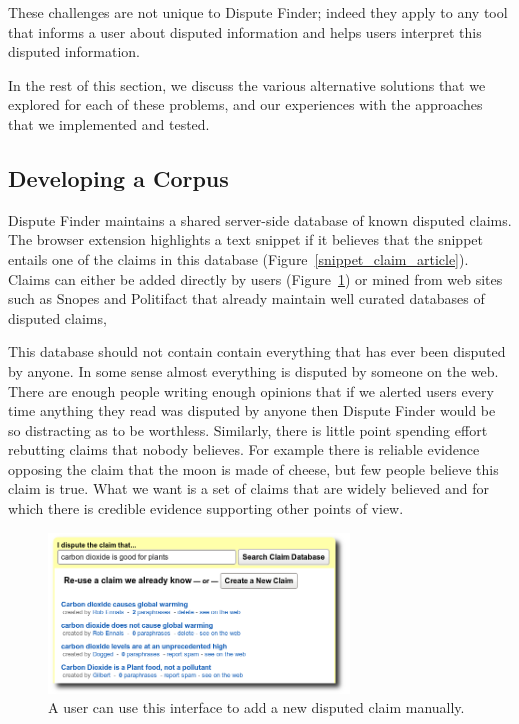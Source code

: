 \documentclass{www2010-submission}
\begin{document}
These challenges are not unique to Dispute Finder; indeed they apply to any tool that informs a user about disputed information and helps users interpret this disputed information.

In the rest of this section, we discuss the various alternative solutions that we explored for each of these problems, and our experiences with the approaches that we implemented and tested.


\subsection{Developing a Corpus}
\label{sec:disputed}

Dispute Finder maintains a shared server-side database of known disputed claims. The browser extension highlights a text snippet if it believes that the snippet entails one of the claims in this database (Figure~\ref{snippet_claim_article}). Claims can either be added directly by users (Figure~\ref{add_claim}) or mined from web sites such as Snopes and Politifact that already maintain well curated databases of disputed claims, 

This database should not contain contain everything that has ever been disputed by anyone. In some sense almost everything is disputed by someone on the web. There are enough people writing enough opinions that if we alerted users every time anything they read was disputed by anyone then Dispute Finder would be so distracting as to be worthless. Similarly, there is little point spending effort rebutting claims that nobody believes. For example there is reliable evidence opposing the claim that the moon is made of cheese, but few people believe this claim is true. What we want is a set of claims that are widely believed and for which there is credible evidence supporting other points of view.

\begin{figure}[tb]
	\begin{center}
	\includegraphics[width=8cm]{pictures/add_claim_list.png}
	\caption{A user can use this interface to add a new disputed claim manually.}
	\label{add_claim}
	\end{center}
\end{figure}
\end{document}
